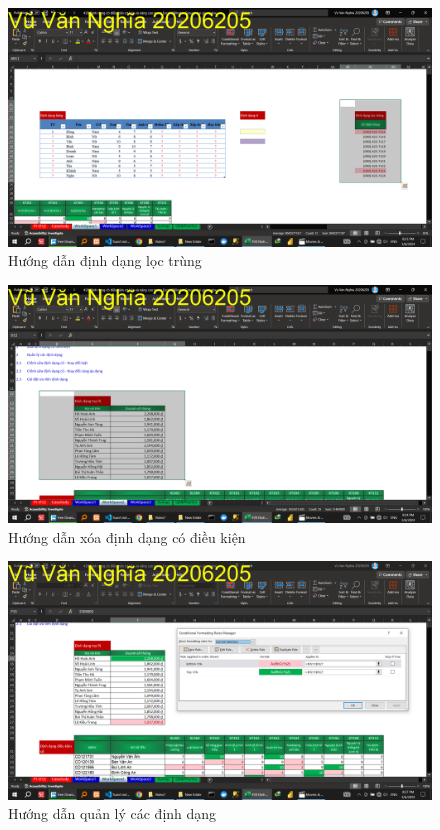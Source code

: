 \documentclass{article}
\begin{document}
\begin{figure}[H]
\centering
\includegraphics[scale = 0.15]{Video7/HuongDan/5.png}
\caption{Hướng dẫn định dạng lọc trùng}
\end{figure}

\begin{figure}[H]
\centering
\includegraphics[scale = 0.15]{Video7/HuongDan/6.png}
\caption{Hướng dẫn xóa định dạng có điều kiện}
\end{figure}

\begin{figure}[H]
\centering
\includegraphics[scale = 0.15]{Video7/HuongDan/7.png}
\caption{Hướng dẫn quản lý các định dạng}
\end{figure}
\end{document}
